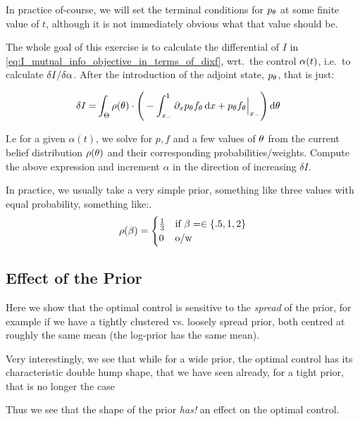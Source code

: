 In practice of-course, we will set the terminal conditions for $p_{ \theta}$ at some
finite value of $t$, although it is not immediately obvious what that
value should be.

\vskip10pt The whole goal of this exercise is to calculate the differential of
$I$ in \cref{eq:I_mutual_info_objective_in_terms_of_dixf},
wrt.\ the control $\alpha(t)$, i.e.\ to calculate $\delta I / \delta \alpha$. After the
introduction of the adjoint state, $p_{ \theta}$, that is just:

 
\begin{align*}
\delta I =&   
\int_\Theta  \rho({ \theta}) \cdot \Bigg(  
- \int_{ x_{-} }^{1} {\partial}_x p_{ \theta} f_{ \theta} \, \mathrm{d} x + 
   p_{ \theta} f_{ \theta} \Big|_{ x_{-} } 
    \Bigg) \, \mathrm{d} { \theta}
\end{align*}

I.e for a given $\alpha(t)$, we solve for $p,f$ and a few values of ${ \theta}$ from
the current belief distribution $\rho({ \theta})$ and their corresponding
probabilities/weights. Compute the above expression and increment $\alpha$ in
the direction of increasing $\delta I$.

In practice, we usually take a very simple prior, something like three values
with equal probability, something like:.
\begin{equation}
\rho(\beta) = 
\begin{cases}
	\tfrac 13 & \textrm{if } \beta= \in \{.5,    1 ,  2 \}\\
	0   &\textrm{o/w }
\end{cases}
\label{eq:basic_prior_over_tau}
\end{equation} 

\subsection{Effect of the Prior}

Here we show that the optimal control is sensitive to the {\sl spread} of the
prior, for example if we have a tightly clustered vs. loosely spread prior, both
centred at roughly the same mean (the log-prior has the same mean). 

Very interestingly, we see that while for a wide prior, the optimal control has
its characteristic double hump shape, that we have seen already, for a tight
prior, that is no longer the case

Thus we see that the shape of the prior {\sl has!}
an effect on the optimal control.

